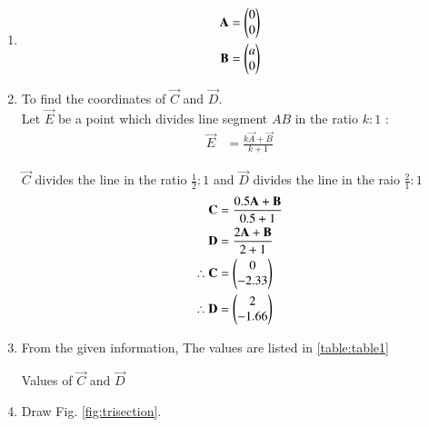 \renewcommand{\theequation}{\theenumi}
\begin{enumerate}[label=\thesection.\arabic*.,ref=\thesection.\theenumi]


\item 
\begin{align}
\mathbf{A} &=\begin{pmatrix}0\\0\end{pmatrix} \label{eq:constr_a}\\
\mathbf{B} &=\begin{pmatrix}a\\0\end{pmatrix} \label{eq:constr_b}
\end{align}

\item To find the coordinates of $\vec{C}$ and $\vec{D}$. \\
\solution Let $\vec{E}$ be a point which divides line segment $AB$
in the ratio $k : 1$ :
\begin{align}
\vec{E} &= \frac{k\vec{A}+\vec{B}}{k+1}
\end{align}

$\vec{C}$ divides the line in the ratio $\frac{1}{2} : 1 $ and $\vec{D}$ divides the line in the raio $\frac{2}{1} : 1 $
\begin{align}
\mathbf{C} &= \frac{0.5\mathbf{A}+\mathbf{B}}{0.5+1} \\
\mathbf{D} &= \frac{2\mathbf{A}+\mathbf{B}}{2+1} \\
\therefore \mathbf{C} &= \begin{pmatrix}0\\-2.33\end{pmatrix}\\
\therefore \mathbf{D} &= \begin{pmatrix}2\\-1.66\end{pmatrix}
\end{align}


\item
From the given information, 
The values are listed in \ref{table:table1}\\

\begin{table}[ht!]
\centering

\caption{Values of $\vec{C}$ and $\vec{D}$}
\label{table:table1}	
\end{table} 

\item Draw Fig. \ref{fig:trisection}.


\end{enumerate}

